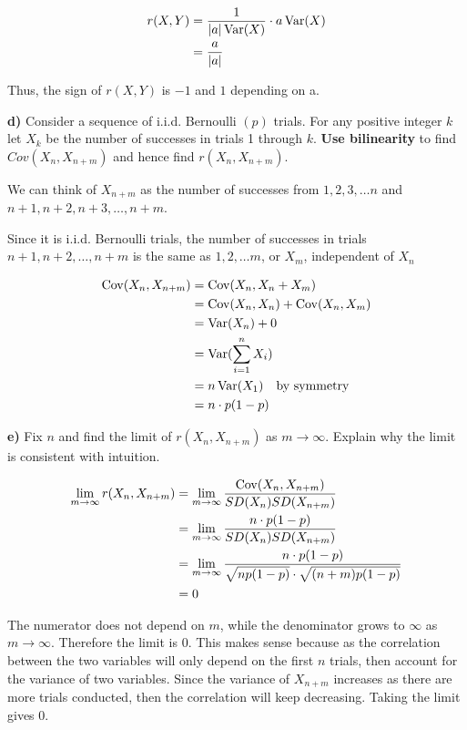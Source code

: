 \documentclass[11pt]{article}
\begin{document}
\begin{align*}
	r(X,Y) &= \frac{1}{|a|\operatorname{Var}(X)} \cdot a\operatorname{Var}(X) \\
	&= \frac{a}{|a|} \\
\end{align*}

Thus, the sign of $ r(X,Y) $ is $ -1 $ and $ 1 $ depending on a. 

\textbf{d)} Consider a sequence of i.i.d. Bernoulli \((p)\) trials. For
any positive integer \(k\) let \(X_k\) be the number of successes in
trials 1 through \(k\). \textbf{Use bilinearity} to find
\(Cov(X_n, X_{n+m})\) and hence find \(r(X_n, X_{n+m})\).


We can think of $ X_{n+m} $ as the number of successes from $ 1,2,3,\dots n $ and $ n+1,n+2,n+3,\dots, n+m $.

Since it is i.i.d. Bernoulli trials, the number of successes in trials  $ n+1, n+2, \dots, n+m $ is the same as $ 1,2,\dots m $, or $ X_{m} $, independent of $ X_{n} $  

\begin{align*}
	\operatorname{Cov}(X_{n}, X_{n+m}) &= \operatorname{Cov}(X_{n}, X_{n} + X_{m}) \\
	&= \operatorname{Cov}(X_{n}, X_{n}) + \operatorname{Cov}(X_{n}, X_{m}) \\
	&= \operatorname{Var}(X_{n}) + 0 \\
	&= \operatorname{Var}(\sum_{i=1}^{n}X_{i}) \\
	&= n\operatorname{Var}(X_{1}) \quad \text{by symmetry} \\
	&= n\cdot p(1-p) \\
\end{align*}







\textbf{e)} Fix \(n\) and find the limit of \(r(X_n, X_{n+m})\) as
\(m \to \infty\). Explain why the limit is consistent with intuition.

\begin{align*}
	\lim_{m\to \infty }r(X_{n}, X_{n+m}) &= \lim_{m\to\infty } \frac{\operatorname{Cov}(X_{n},X_{n+m})}{SD(X_{n})SD(X_{n+m})} \\
	&= \lim_{m\to\infty } \frac{n \cdot p(1-p)}{SD(X_{n}) SD(X_{n+m})} \\
	&= \lim_{m\to \infty } \frac{n \cdot p(1-p)}{\sqrt{np(1-p)} \cdot \sqrt{(n+m)p(1-p)}} \\
	&= 0 \\
\end{align*}

The numerator does not depend on $ m $, while the denominator grows to $ \infty  $ as $ m \to \infty  $. Therefore the limit is 0. This makes sense because as the correlation between the two variables will only depend on the first $ n $ trials, then account for the variance of two variables. Since the variance of $ X_{n+m} $ increases as there are more trials conducted, then the correlation will keep decreasing. Taking the limit gives 0. 
\end{document}
